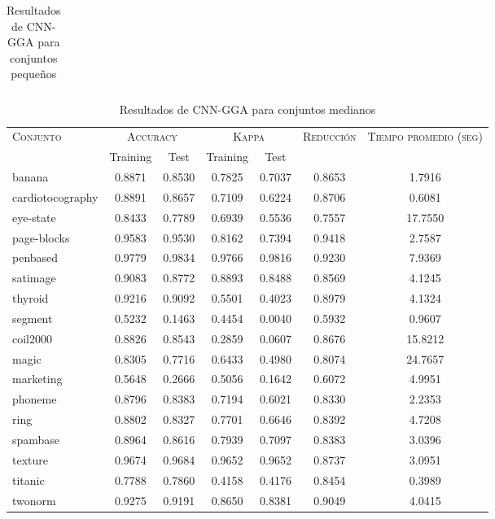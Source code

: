 \begin{table}[]
\begin{tabular}{l c c c c c c}
\hline
\end{tabular}
\caption{Resultados de CNN-GGA para conjuntos pequeños }
\label{res-peq-cnn-gga}
\end{table}



\begin{table}[]
\centering
\begin{tabular}{l c c c c c c}
\hline
\multirow{2}{*}{\textsc{Conjunto}}
	& \multicolumn{2}{c}{\textsc{Accuracy}}
	& \multicolumn{2}{c}{\textsc{Kappa}}
	& \textsc{Reducción}
	& \textsc{Tiempo promedio (seg)} \\
	& Training & Test
	& Training & Test \\ 
\hline
\hline

banana & 0.8871 & 0.8530 & 0.7825 & 0.7037 & 0.8653 & 1.7916 \\
cardiotocography & 0.8891 & 0.8657 & 0.7109 & 0.6224 & 0.8706 & 0.6081 \\
eye-state & 0.8433 & 0.7789 & 0.6939 & 0.5536 & 0.7557 & 17.7550 \\
page-blocks & 0.9583 & 0.9530 & 0.8162 & 0.7394 & 0.9418 & 2.7587 \\
penbased & 0.9779 & 0.9834 & 0.9766 & 0.9816 & 0.9230 & 7.9369 \\
satimage & 0.9083 & 0.8772 & 0.8893 & 0.8488 & 0.8569 & 4.1245 \\
thyroid & 0.9216 & 0.9092 & 0.5501 & 0.4023 & 0.8979 & 4.1324 \\
segment & 0.5232 & 0.1463 & 0.4454 & 0.0040 & 0.5932 & 0.9607 \\
coil2000 & 0.8826 & 0.8543 & 0.2859 & 0.0607 & 0.8676 & 15.8212 \\
magic & 0.8305 & 0.7716 & 0.6433 & 0.4980 & 0.8074 & 24.7657 \\
marketing & 0.5648 & 0.2666 & 0.5056 & 0.1642 & 0.6072 & 4.9951 \\
phoneme & 0.8796 & 0.8383 & 0.7194 & 0.6021 & 0.8330 & 2.2353 \\
ring & 0.8802 & 0.8327 & 0.7701 & 0.6646 & 0.8392 & 4.7208 \\
spambase & 0.8964 & 0.8616 & 0.7939 & 0.7097 & 0.8383 & 3.0396 \\
texture & 0.9674 & 0.9684 & 0.9652 & 0.9652 & 0.8737 & 3.0951 \\
titanic & 0.7788 & 0.7860 & 0.4158 & 0.4176 & 0.8454 & 0.3989 \\
twonorm & 0.9275 & 0.9191 & 0.8650 & 0.8381 & 0.9049 & 4.0415 \\

\hline
\end{tabular}
\caption{Resultados de CNN-GGA para conjuntos medianos }
\label{res-med-cnn-gga}
\end{table}



